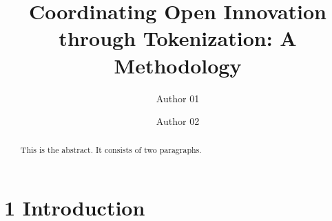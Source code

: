\documentclass[]{elsarticle} %
\begin{document}
\begin{frontmatter}

  \title{Coordinating Open Innovation through Tokenization: A Methodology}
    \author[University]{Author 01}
    \author[University]{Author 02}
  
      \address[University 01]{Department, Street, City, State, Zip}
    \address[University 02]{Department, Street, City, State, Zip}
  
  \begin{abstract}
  This is the abstract. It consists of two paragraphs.
  \end{abstract}
  
 \end{frontmatter}

\section{1 Introduction}\label{introduction}
\end{document}
